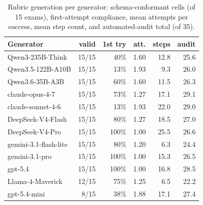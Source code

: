 \begin{table}[t]
\centering
\small
\begin{tabular*}{\textwidth}{@{\extracolsep{\fill}}lrrrrr@{}}
\toprule
Generator & valid & 1st try & att. & steps & audit \\
\midrule
Qwen3-235B-Think & 15/15 & 40\% & 1.60 & 12.8 & 25.6 \\
Qwen3.5-122B-A10B & 15/15 & 13\% & 1.93 & 9.3 & 26.0 \\
Qwen3.6-35B-A3B & 15/15 & 60\% & 1.60 & 11.5 & 26.3 \\
claude-opus-4-7 & 15/15 & 73\% & 1.27 & 17.1 & 29.1 \\
claude-sonnet-4-6 & 15/15 & 13\% & 1.93 & 22.0 & 29.0 \\
DeepSeek-V4-Flash & 15/15 & 80\% & 1.27 & 18.5 & 27.0 \\
DeepSeek-V4-Pro & 15/15 & 100\% & 1.00 & 25.5 & 26.6 \\
gemini-3.1-flash-lite & 15/15 & 80\% & 1.20 & 6.3 & 24.4 \\
gemini-3.1-pro & 15/15 & 100\% & 1.00 & 15.3 & 26.5 \\
gpt-5.4 & 15/15 & 100\% & 1.00 & 16.8 & 28.5 \\
Llama-4-Maverick & 12/15 & 75\% & 1.25 & 6.5 & 22.2 \\
gpt-5.4-mini & 8/15 & 38\% & 1.88 & 17.1 & 27.4 \\
\bottomrule
\end{tabular*}
\caption{Rubric generation per generator: schema-conformant cells (of 15 exams), first-attempt compliance, mean attempts per success, mean step count, and automated-audit total (of 35).}
\label{tab:compliance}
\end{table}